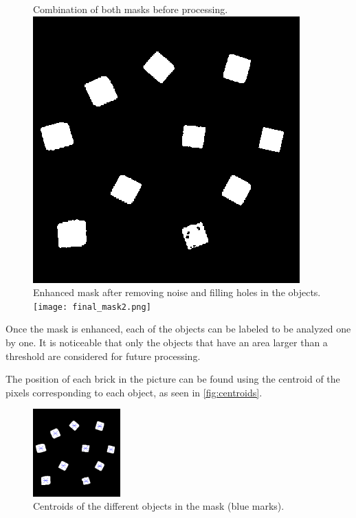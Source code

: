 \begin{figure}[H]
    \captionbox  %
    {
        Combination of both masks before processing.             
        \label{fig:final_mask}                                  
    }                                                                 
    {                                                                  
        \includegraphics[width=.25\textwidth]{figures/final_mask.png}         
    }                                                                    
    \hspace{5pt}                                                          
    \captionbox
    {       
        Enhanced mask after removing noise and filling holes in the objects.
        \label{fig:final_mask2}                                     
    }
    {
        \texttt{[image: final\_mask2.png]}            
    }                                                                             
\end{figure}

Once the mask is enhanced, each of the objects can be labeled to be analyzed one by one. It is noticeable that only the objects that have an area larger than a threshold are considered for future processing.

The position of each brick in the picture can be found using the centroid of the pixels corresponding to each object, as seen in \autoref{fig:centroids}.

\begin{figure}[H]
    \includegraphics[width=0.3\textwidth]{figures/centroids.png}
    \caption{Centroids of the different objects in the mask (blue marks).}
    \label{fig:centroids}
\end{figure}

